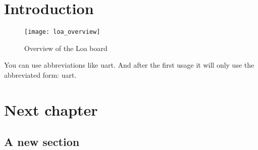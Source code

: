 
\chapter{Introduction}

\blindtext

\begin{figure}[htpb]
\centering
\texttt{[image: loa\_overview]}
\caption{Overview of the Loa board}
\label{fig:overview}
\end{figure}

You can use abbreviations like \ac{uart}. And after the first usage it will only use the abbreviated form: \ac{uart}.

\blindtext[4]

\chapter{Next chapter}

\blindtext[2]

\section{A new section}

\blindtext[2]

